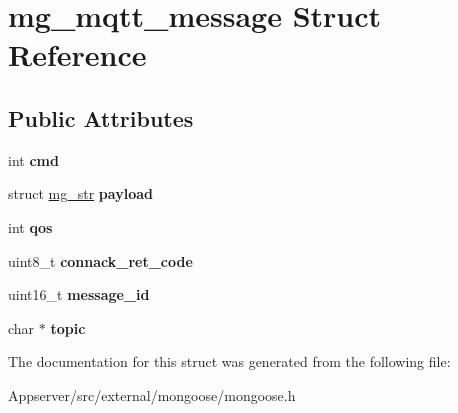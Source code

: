 \hypertarget{structmg__mqtt__message}{}\section{mg\+\_\+mqtt\+\_\+message Struct Reference}
\label{structmg__mqtt__message}
\subsection*{Public Attributes}
\begin{DoxyCompactItemize}
\item 
int {\bfseries cmd}\hypertarget{structmg__mqtt__message_abfc247fa4aaf411b0957e71df6f6ce2b}{}\label{structmg__mqtt__message_abfc247fa4aaf411b0957e71df6f6ce2b}

\item 
struct \hyperlink{structmg__str}{mg\+\_\+str} {\bfseries payload}\hypertarget{structmg__mqtt__message_a12215d63bfcd1341849add871ef0efc7}{}\label{structmg__mqtt__message_a12215d63bfcd1341849add871ef0efc7}

\item 
int {\bfseries qos}\hypertarget{structmg__mqtt__message_a5c5bca3da240c7a3cbc7bef8b67bc90e}{}\label{structmg__mqtt__message_a5c5bca3da240c7a3cbc7bef8b67bc90e}

\item 
uint8\+\_\+t {\bfseries connack\+\_\+ret\+\_\+code}\hypertarget{structmg__mqtt__message_a4a6ff07b1d3fb2f06de4422d13e8e1ec}{}\label{structmg__mqtt__message_a4a6ff07b1d3fb2f06de4422d13e8e1ec}

\item 
uint16\+\_\+t {\bfseries message\+\_\+id}\hypertarget{structmg__mqtt__message_aa62fb03efa898fe46058b34e6031f8db}{}\label{structmg__mqtt__message_aa62fb03efa898fe46058b34e6031f8db}

\item 
char $\ast$ {\bfseries topic}\hypertarget{structmg__mqtt__message_a2fb06fa6d1792f9f529138dd8dd93a80}{}\label{structmg__mqtt__message_a2fb06fa6d1792f9f529138dd8dd93a80}

\end{DoxyCompactItemize}


The documentation for this struct was generated from the following file\+:\begin{DoxyCompactItemize}
\item 
Appserver/src/external/mongoose/mongoose.\+h\end{DoxyCompactItemize}
